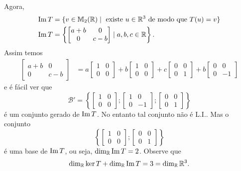 \begin{exemplos}
\begin{enumerate}
\begin{solucao}
			Agora,
			\begin{align*}
				{\rm Im\,} T &= \{v \in \mathbb{M}_2(\mathbb{R}) \mid \mbox{ existe } u \in \mathbb{R}^3 \mbox{ de modo que } T(u) = v\}\\
				{\rm Im\,} T &= \left\{ \begin{bmatrix}
					a + b & 0\\
					0 & c - b
				\end{bmatrix} \mid a, b, c \in \mathbb{R}\right\}.
			\end{align*}
			Assim temos
			\begin{align*}
				\begin{bmatrix}
					a + b & 0\\
					0 & c - b
				\end{bmatrix} &= a \begin{bmatrix}
					1 & 0\\ 0 & 0
				\end{bmatrix} + b \begin{bmatrix}
					1 & 0\\ 0 & 0
				\end{bmatrix} + c \begin{bmatrix}
					0 & 0\\ 0 & 1
				\end{bmatrix} + b \begin{bmatrix}
					0 & 0\\ 0 & -1
				\end{bmatrix}
			\end{align*}
			e é fácil ver que
			\[
				\mathcal{B}' = \left\{ \begin{bmatrix}
					1 & 0\\ 0 & 0
				\end{bmatrix}; \begin{bmatrix}
					1 & 0\\ 0 & -1
				\end{bmatrix}; \begin{bmatrix}
					0 & 0\\ 0 & 1
				\end{bmatrix}\right\}
			\]
			é um conjunto gerado de ${\rm Im\,} T$. No entanto tal conjunto não é L.I.. Mas o conjunto
			\[
				\left\{ \begin{bmatrix}
					1 & 0\\ 0 & 0
				\end{bmatrix}; \begin{bmatrix}
					0 & 0\\ 0 & 1
				\end{bmatrix}\right\}
			\]
			é uma base de ${\rm Im\,} T$, ou seja, $\dim_{\mathbb{R}}{\rm Im\,} T = 2$. Observe que
			\[
				\dim_{\mathbb{R}}\ker T + \dim_{\mathbb{R}}{\rm Im\,} T = 3 = \dim_{\mathbb{R}}\mathbb{R}^3.
			\]
		\end{solucao}


\end{enumerate}
\end{exemplos}
